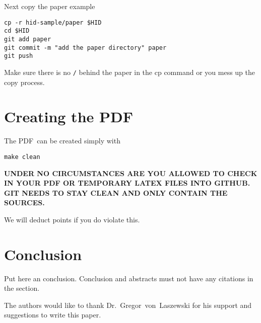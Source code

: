Next copy the paper example

\begin{verbatim}
cp -r hid-sample/paper $HID
cd $HID
git add paper
git commit -m "add the paper directory" paper
git push
\end{verbatim}

Make sure there is no \verb|/| behind the paper in the cp command or you mess up the
copy process.


\section{Creating the PDF}

The PDF\ can be created simply with 

\begin{verbatim}
make clean
\end{verbatim}



{\bf UNDER NO CIRCUMSTANCES ARE YOU ALLOWED TO CHECK IN YOUR PDF OR
  TEMPORARY LATEX FILES INTO GITHUB. GIT NEEDS TO STAY CLEAN AND ONLY
  CONTAIN THE SOURCES.}

We will deduct points if you do violate this.

\section{Conclusion}

Put here an conclusion. Conclusion and abstracts must not have any
citations in the section.


\begin{acks}

  The authors would like to thank Dr.~Gregor~von~Laszewski for his
  support and suggestions to write this paper.

\end{acks}


 

